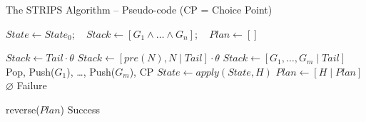 \documentclass[presentation]{beamer}\mode<presentation>{\usetheme{AMSBolognaFC}}
\begin{document}
\begin{frame}[c]{The STRIPS Algorithm -- Pseudo-code \hfill {\scriptsize(CP = Choice Point)}}

    	\begin{algorithmic}\small

    			\State $State \leftarrow State_0$; ~ $Stack \leftarrow [G_1 \wedge \dots \wedge G_n]$; ~ $Plan \leftarrow []$

    			\State

    			 
    					\State $Stack \leftarrow Tail \cdot \theta$ 
    				 
    					\State $Stack \leftarrow [pre(N), N \mid Tail] \cdot \theta$  
    					\State $Stack \leftarrow [G_1, \ldots, G_m \mid Tail]$ \Comment Pop, Push($G_1$), \ldots, Push($G_m$), \alert{CP}
    					\State $State \leftarrow apply(State, H)$
    					\State $Plan \leftarrow [H \mid Plan]$
    				\Else
    					\State \Return $\varnothing$ \Comment Failure
    				\EndIf
    			\EndWhile

    			\State

    			\State \Return reverse($Plan$) \Comment Success
    		\EndFunction
    	\end{algorithmic}

\end{frame}
\end{document}
